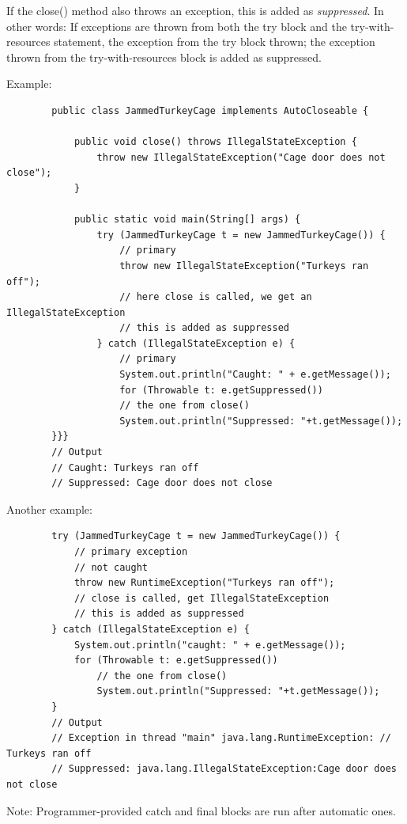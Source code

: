 \documentclass{scrartcl}
\begin{document}
    If the close() method also throws an exception, this is added as \textit{suppressed}. In other words: If exceptions are thrown from both the try block and the try-with-resources statement,
    the exception from the try block thrown; the exception thrown from the try-with-resources block is added as suppressed.

    Example:
    \begin{lstlisting}
        public class JammedTurkeyCage implements AutoCloseable {

            public void close() throws IllegalStateException {
                throw new IllegalStateException("Cage door does not close");
            }

            public static void main(String[] args) {
                try (JammedTurkeyCage t = new JammedTurkeyCage()) {
                    // primary
                    throw new IllegalStateException("Turkeys ran off");
                    // here close is called, we get an IllegalStateException
                    // this is added as suppressed
                } catch (IllegalStateException e) {
                    // primary
                    System.out.println("Caught: " + e.getMessage());
                    for (Throwable t: e.getSuppressed())
                    // the one from close()
                    System.out.println("Suppressed: "+t.getMessage());
        }}}
        // Output
        // Caught: Turkeys ran off
        // Suppressed: Cage door does not close
    \end{lstlisting}

    Another example:
    \begin{lstlisting}
        try (JammedTurkeyCage t = new JammedTurkeyCage()) {
            // primary exception
            // not caught
            throw new RuntimeException("Turkeys ran off");
            // close is called, get IllegalStateException
            // this is added as suppressed
        } catch (IllegalStateException e) {
            System.out.println("caught: " + e.getMessage());
            for (Throwable t: e.getSuppressed())
                // the one from close()
                System.out.println("Suppressed: "+t.getMessage());
        }
        // Output
        // Exception in thread "main" java.lang.RuntimeException: // Turkeys ran off
        // Suppressed: java.lang.IllegalStateException:Cage door does not close
    \end{lstlisting}

    Note: Programmer-provided catch and final blocks are run after automatic ones.
\end{document}
